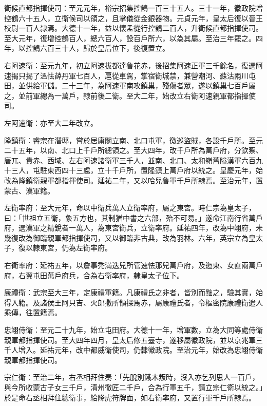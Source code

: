 \begin{pinyinscope}
 衛候直都指揮使司：至元元年，裕宗招集控鶴一百三十五人。三十一年，徽政院增控鶴六十五人，立衛候司以領之，且掌儀從金銀器物。元貞元年，皇太后復以晉王校尉一百人隸焉。大德十一年，益以懷孟從行控鶴二百人，升衛候直都指揮使司。至大元年，復增控鶴百人，總六百人，設百戶所六，以為其屬。至治三年罷之。四年，以控鶴六百三十人，歸於皇后位下，後復置立。



 右阿速衛：至元九年，初立阿速拔都達魯花赤，後招集阿速正軍三千餘名，復選阿速揭只揭了溫怯薛丹軍七百人，扈從車駕，掌宿衛城禁，兼營潮河、蘇沽兩川屯田，並供給軍儲。二十三年，為阿速軍南攻鎮巢，殘傷者眾，遂以鎮巢七百戶屬之，並前軍總為一萬戶，隸前後二衛。至大二年，始改立右衛阿速親軍都指揮使司。



 左阿速衛：亦至大二年改立。



 隆鎮衛：睿宗在潛邸，嘗於居庸關立南、北口屯軍，徼巡盜賊，各設千戶所。至元二十五年，以南、北口上千戶所總領之。至大四年，改千戶所為萬戶府，分欽察、唐兀、貴赤、西域、左右阿速諸衛軍三千人，並南、北口、太和嶺舊隘漢軍六百九十三人，屯駐東西四十三處，立十千戶所，置隆鎮上萬戶府以統之。皇慶元年，始改為隆鎮衛親軍都指揮使司。延祐二年，又以哈兒魯軍千戶所隸焉。至治元年，置蒙古、漢軍籍。



 左衛率府：至大元年，命以中衛兵萬人立衛率府，屬之東宮。時仁宗為皇太子，曰：「世祖立五衛，象五方也，其制猶中書之六部，殆不可易。」遂命江南行省萬戶府，選漢軍之精銳者一萬人，為東宮衛兵，立衛率府。延祐四年，改為中翊府，未幾復改為御臨親軍都指揮使司，又以御臨非古典，改為羽林。六年，英宗立為皇太子，復以隸東宮，仍為左衛率府。



 右衛率府：延祐五年，以詹事禿滿迭兒所管速怯那兒萬戶府，及迤東、女直兩萬戶府，右翼屯田萬戶府兵，合為右衛率府，隸皇太子位下。



 康禮衛：武宗至大三年，定康禮軍籍。凡康禮氏之非者，皆別而黜之，驗其實，始得入籍。及諸侯王阿只吉、火郎撒所領探馬赤，屬康禮氏者，令樞密院康禮衛遣人乘傳，往置籍焉。



 忠翊侍衛：至元二十九年，始立屯田府。大德十一年，增軍數，立為大同等處侍衛親軍都指揮使司。至大四年四月，皇太后修五臺寺，遂移屬徽政院，並以京兆軍三千人增入。延祐元年，改中都威衛使司，仍隸徽政院。至治元年，始改為忠翊侍衛親軍都指揮使司。



 宗仁衛：至治二年，右丞相拜住奏：「先脫別鐵木叛時，沒入亦乞列思人一百戶，與今所收蒙古子女三千戶，清州徹匠二千戶，合為行軍五千，請立宗仁衛以統之。」於是命右丞相拜住總衛事，給降虎符牌面，如右衛率府，又置行軍千戶所隸焉。




\end{pinyinscope}
